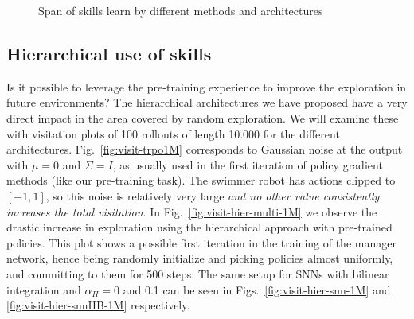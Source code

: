 \documentclass{article} %
\begin{document}
\begin{figure}[h]
{	}
	\caption{Span of skills learn by different methods and architectures}
	\label{fig:visit_methods}
\end{figure}


\subsection{Hierarchical use of skills}

Is it possible to leverage the pre-training experience to improve the exploration in future environments? The hierarchical architectures we have proposed have a very direct impact in the area covered by random exploration. We will examine these with visitation plots of 100 rollouts of length 10.000 for the different architectures. Fig.\ \ref{fig:visit-trpo1M} corresponds to Gaussian noise at the output with $\mu=0$ and $\Sigma=I$, as usually used in the first iteration of policy gradient methods (like our pre-training task). The swimmer robot has actions clipped to $[-1,1]$, so this noise is relatively very large \textit{and no other value consistently increases the total visitation}. In Fig.\ \ref{fig:visit-hier-multi-1M} we observe the drastic increase in exploration using the hierarchical approach with pre-trained policies. This plot shows a possible first iteration in the training of the manager network, hence being randomly initialize and picking policies almost uniformly, and committing to them for 500 steps. The same setup for SNNs with bilinear integration and $\alpha_H= 0$ and 0.1 can be seen in Figs.\ \ref{fig:visit-hier-snn-1M} and \ref{fig:visit-hier-snnHB-1M} respectively.
\end{document}
